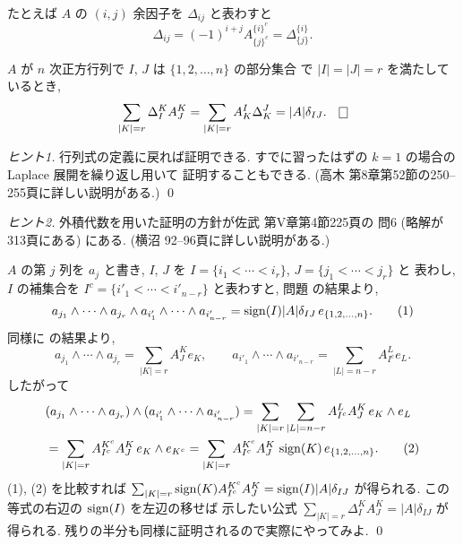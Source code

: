 \documentclass[12pt,twoside]{jarticle}
\begin{document}
たとえば $A$ の $(i,j)$ 余因子を $\Delta_{ij}$ と表わすと
\begin{equation*}
  \Delta_{ij} = (-1)^{i+j} A^{\{i\}^c}_{\{j\}^c} = \Delta^{\{i\}}_{\{j\}}.
\end{equation*}


\begin{question}
  $A$ が $n$ 次正方行列で $I$, $J$ は $\{1,2,\ldots,n\}$ の部分集合
  で $|I|=|J|=r$ を満たしているとき, 
  \begin{equation*}
      \sum_{|K|=r} \Delta^K_I A^K_J
    = \sum_{|K|=r} A^I_K \Delta^J_K
    = |A| \delta_{IJ}.
    \qed
  \end{equation*}
\end{question}

\begin{proof}[ヒント1]
  行列式の定義に戻れば証明できる. 
  すでに習ったはずの $k=1$ の場合の Laplace 展開を繰り返し用いて
  証明することもできる.
  (高木 \cite{takagi1} 第8章第52節の250--255頁に詳しい説明がある.)
  \qed
\end{proof}

\begin{proof}[ヒント2]
  外積代数を用いた証明の方針が佐武 \cite{satake} 第V章第4節225頁の
  問6 (略解が313頁にある) にある. 
  (横沼 \cite{yokonuma} 92--96頁に詳しい説明がある.)

  $A$ の第 $j$ 列を $a_j$ と書き, $I$, $J$ を
  $I=\{i_1<\cdots<i_r\}$, $J=\{j_1<\cdots<j_r\}$ と
  表わし, $I$ の補集合を $I^c=\{i'_1<\cdots<i'_{n-r}\}$ と表わすと,
  問題  の結果より, 
  \begin{equation*}
    a_{j_1}\wedge\cdots\wedge a_{j_r}
    \wedge a_{i'_1}\wedge\cdots\wedge a_{i'_{n-r}}
    = \mathop{\mathrm{sign}}\nolimits(I)|A|\delta_{IJ} \,e_{\{1,2,\ldots,n\}}.
    \tag{1}
  \end{equation*}
  同様に  の結果より,
  \begin{equation*}
    a_{j_1}\wedge\cdots\wedge a_{j_r}
    = \sum_{|K|=r} A^K_J e_K,
    \qquad
    a_{i'_1}\wedge\cdots\wedge a_{i'_{n-r}}
    = \sum_{|L|=n-r} A^L_{I^c} e_L.
  \end{equation*}
  したがって
  \begin{align*}
    &
    (a_{j_1}\wedge\cdots\wedge a_{j_r})\wedge
    (a_{i'_1}\wedge\cdots\wedge a_{i'_{n-r}})
    = \sum_{|K|=r}\sum_{|L|=n-r} A^L_{I^c} A^K_J \,e_K\wedge e_L
    \\ &
    = \sum_{|K|=r} A^{K^c}_{I^c} A^K_J \,e_K\wedge e_{K^c}
    = \sum_{|K|=r} A^{K^c}_{I^c} A^K_J \,\mathop{\mathrm{sign}}\nolimits(K)\,e_{\{1,2,\ldots,n\}}.
    \tag{2}
  \end{align*}
  (1), (2) を比較すれば \(
    \sum_{|K|=r} \mathop{\mathrm{sign}}\nolimits(K) A^{K^c}_{I^c} A^K_J
    = \mathop{\mathrm{sign}}\nolimits(I)|A|\delta_{IJ}
  \) が得られる. この等式の右辺の $\mathop{\mathrm{sign}}\nolimits(I)$ を左辺の移せば
  示したい公式 \(
      \sum_{|K|=r} \Delta^K_I A^K_J
    = |A| \delta_{IJ}
  \) が得られる.  残りの半分も同様に証明されるので実際にやってみよ. 
  \qed
\end{proof}
\end{document}
